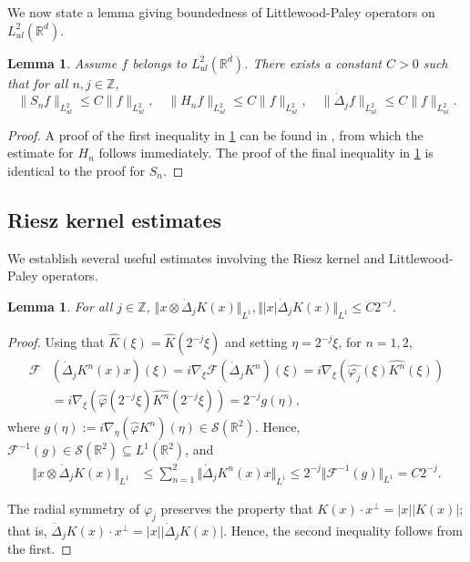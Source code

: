 \documentclass[11pt,reqno,xcolor=svgnames]{amsart}
\def\R{{\mathbb R}}
\def\Z{{\mathbb Z}}
\theoremstyle{plain}
\newtheorem{lemma}[theorem]{Lemma}
\theoremstyle{definition}
\theoremstyle{plain}
\theoremstyle{remark}
\newcommand{\abs}[1]{\left\vert#1\right\vert}
\newcommand{\smallabs}[1]{\ensuremath{\vert #1 \vert}}
\newcommand{\grad}{\ensuremath{\nabla}}
\newcommand{\pr}[1]{\ensuremath{\left( #1 \right) }}
\newcommand{\smallnorm}[1]{\ensuremath{\Vert #1 \Vert}}
\newcommand{\Cal}[1]{\ensuremath{\mathcal{#1}}}
\newcommand{\wh}{\widehat}
\newcommand{\FTF}
    {\Cal{F}}
\newcommand{\FTR}
    {\Cal{F}^{-1}}
\newcommand{\Del}{\dot{\Delta}}
\begin{document}
We now state a lemma giving boundedness of Littlewood-Paley operators on $L^2_{ul}(\R^d)$.  
\begin{lemma}\label{SnBound}
Assume $f$ belongs to $L^2_{ul}(\R^d)$.  There exists a constant $C>0$ such that for all $n, j\in\Z$,
    \begin{equation*}
        \| S_n f \|_{L^2_{ul}} \leq C\|f \|_{L^2_{ul}},\quad
        \| H_n f \|_{L^2_{ul}} \leq C\|f \|_{L^2_{ul}},\quad
        \| \dot{\Delta}_j f \|_{L^2_{ul}} \leq C\|f \|_{L^2_{ul}}.
    \end{equation*}
\end{lemma}
\begin{proof} A proof of the first inequality in \cref{SnBound} can be found in \cite{ACEK}, from which the estimate for $H_n$ follows immediately.  The proof of the final inequality in \cref{SnBound} is identical to the proof for $S_n$. \end{proof}


\subsection{Riesz kernel estimates}  We establish several useful estimates involving the Riesz kernel and Littlewood-Paley operators.
\begin{lemma}\label{L:DelKxBound}
    For all $j \in \Z$,
	$\smallnorm{x \otimes \Del_j K(x)}_{L^1},
    \smallnorm{\abs{x} \Del_j K(x)}_{L^1} \le C 2^{-j}$.
\end{lemma}
\begin{proof}
	Using that $\wh{K}(\xi) = \wh{K}(2^{-j} \xi)$ and setting
	$\eta = 2^{-j} \xi$, for $n = 1, 2$,
	\begin{align*}
		\FTF &\pr{\Del_j K^n(x) x}(\xi)
			= i \grad_\xi \FTF \pr{\Del_j K^n}(\xi)
			= i \grad_\xi \pr{\wh{\varphi_j}(\xi) \wh{K^n}(\xi)} \\
			&= i \grad_\xi \pr{\wh{\varphi}(2^{-j} \xi)
				\wh{K^n}(2^{-j} \xi)}
			= 2^{-j} g(\eta),
	\end{align*}
	where $g(\eta) := i \grad_\eta (\wh{\varphi} \wh{K^n})(\eta)
	\in \Cal{S}(\R^2)$. Hence, $\FTR (g) \in \Cal{S}(\R^2) \subseteq L^1(\R^2)$, and
	\begin{align*}
		\smallnorm{x \otimes \Del_j K(x)}_{L^1}
            &\le \sum_{n = 1}^2 \smallnorm{\Del_j K^n(x) x}_{L^1}
            \le 2^{-j} \smallnorm{\FTR (g)}_{L^1}
			= C 2^{-j}.
	\end{align*}

    The radial symmetry of $\varphi_j$ preserves the property that $K(x) \cdot x^\perp = \abs{x} \abs{K(x)}$; that is, $\Del_j K(x) \cdot x^\perp = \abs{x} \smallabs{\Del_j K(x)}$. Hence, the second inequality follows from the first.
\end{proof}
\end{document}
